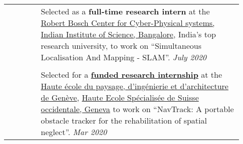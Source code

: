 \documentclass[letterpaper, 10pt, oneside]{article}
\begin{document}
\begin{longtable}{@{} p{0.13\linewidth} p{0.8\linewidth}}
                                                      & Selected as a \textbf{full-time research intern} at the
    \href{https://cps.iisc.ac.in/}{Robert Bosch Center for Cyber-Physical systems, Indian Institute of Science, Bangalore}, India's top research university, to work on
    ``Simultaneous Localisation And Mapping - SLAM''.
    \hfill \textsl{July 2020}                                                                                                                                                                                                                                 \\
    \\[-1ex]

                                                      & Selected for a \href{https://drive.google.com/file/d/1Rtlu6aHQKXntWhfEUcgB5tuNYMuvH04b}{\textbf{funded research internship}}
    at the \href{https://www.hesge.ch/hepia/}{Haute école du paysage, d'ingénierie et d'architecture de Genève}, \href{https://www.hesge.ch/geneve}{Haute Ecole Spécialisée de Suisse occidentale, Geneva}
    to work on ``NavTrack: A portable obstacle tracker for the rehabilitation of spatial neglect''.           \hfill \textsl{Mar 2020}                                                                                                                        \\
\end{longtable}
\end{document}
